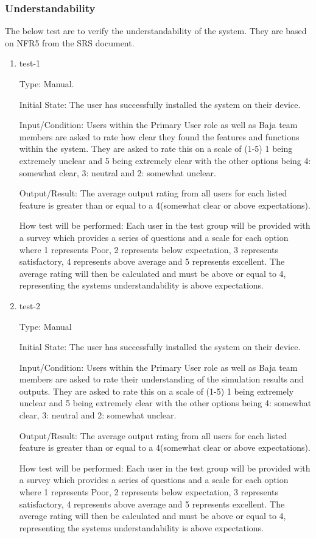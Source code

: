 \documentclass[12pt, titlepage]{article}
\begin{document}
\subsubsection{Understandability}

The below test are to verify the understandability of the system.
They are based on NFR5 from the SRS document.

\begin{enumerate}

\item{test-1\\}

Type: Manual.
					
Initial State: The user has successfully installed the system on their device.
					
Input/Condition: Users within the Primary User role as well as Baja team members are asked to rate how clear they found the features and functions within the system. 
They are asked to rate this on a scale of (1-5) 1 being extremely unclear and 5 being extremely clear with the other options being 4: somewhat clear, 3: neutral and 2: somewhat unclear. 
					
Output/Result: The average output rating from all users for each listed feature is greater than or equal to a 4(somewhat clear or above expectations).
					
How test will be performed: Each user in the test group will be provided with a survey which provides a series of questions and a scale for each option where 1 represents Poor, 2 represents below expectation, 3 represents satisfactory, 4 represents above average and 5 represents excellent.
The average rating will then be calculated and must be above or equal to 4, representing the systems understandability is above expectations.  

\item{test-2\\}

Type: Manual
					
Initial State: The user has successfully installed the system on their device.
					
Input/Condition: Users within the Primary User role as well as Baja team members are asked to rate their understanding of the simulation results and outputs. 
They are asked to rate this on a scale of (1-5) 1 being extremely unclear and 5 being extremely clear with the other options being 4: somewhat clear, 3: neutral and 2: somewhat unclear. 
					
Output/Result: The average output rating from all users for each listed feature is greater than or equal to a 4(somewhat clear or above expectations).
					
How test will be performed: Each user in the test group will be provided with a survey which provides a series of questions and a scale for each option where 1 represents Poor, 2 represents below expectation, 3 represents satisfactory, 4 represents above average and 5 represents excellent.
The average rating will then be calculated and must be above or equal to 4, representing the systems understandability is above expectations. 

\end{enumerate}
\end{document}
